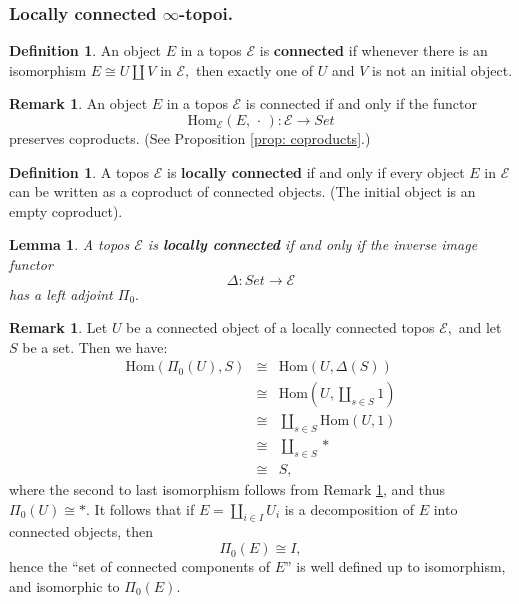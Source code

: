 \documentclass[12pt]{amsart}
\newtheorem{lemma}[dummy]{Lemma}
\theoremstyle{definition}
\newtheorem{definition}[dummy]{Definition}
\newtheorem{remark}[dummy]{Remark}
\newcommand{\cE}{\mathcal{E}}
\newcommand{\Hom}{\mathrm{Hom}}
\renewcommand{\i}{\infty}
\def\blank{\mspace{3mu}\cdot\mspace{3mu}}
\def\Set{\mathit{Set}}
\begin{document}
\subsubsection{Locally connected $\i$-topoi.}

\begin{definition}
An object $E$ in a topos $\cE$ is \textbf{connected} if whenever there is an isomorphism $E \cong U \coprod V$ in $\cE,$ then exactly one of $U$ and $V$ is not an initial object.
\end{definition}

\begin{remark}\label{rmk:connected}
An object $E$ in a topos $\cE$ is connected if and only if the functor $$\Hom_{\cE}\left(E,\blank\right):\cE \to \Set$$ preserves coproducts. (See Proposition \ref{prop: coproducts}.)
\end{remark}

\begin{definition}
A topos $\cE$ is \textbf{locally connected} if and only if every object $E$ in $\cE$ can be written as a coproduct of connected objects. (The initial object is an empty coproduct).
\end{definition}

\begin{lemma}\cite[Lemma C.3.3.6]{Johnstone}
A topos $\cE$ is \textbf{locally connected} if and only if the inverse image functor $$\Delta:\Set \to \cE$$ has a left adjoint $\Pi_0.$
\end{lemma}

\begin{remark}
Let $U$ be a connected object of a locally connected topos $\cE,$ and let $S$ be a set. Then we have:
\begin{eqnarray*}
\Hom\left(\Pi_0\left(U\right),S\right)&\cong& \Hom\left(U,\Delta\left(S\right)\right)\\
&\cong& \Hom\left(U,\underset{s \in S}\coprod 1\right)\\
&\cong& \underset{s \in S} \coprod \Hom\left(U,1\right)\\
&\cong& \underset{s \in S} \coprod *\\
&\cong& S,
\end{eqnarray*}
where the second to last isomorphism follows from Remark \ref{rmk:connected}, and thus $\Pi_0\left(U\right)\cong *.$ It follows that if $E=\underset{i \in I} \coprod U_i$ is a decomposition of $E$ into connected objects, then $$\Pi_0\left(E\right) \cong I,$$ hence the ``set of connected components of $E$'' is well defined up to isomorphism, and isomorphic to $\Pi_0\left(E\right).$
\end{remark}
\end{document}
